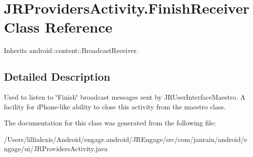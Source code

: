 \hypertarget{classcom_1_1janrain_1_1android_1_1engage_1_1ui_1_1_j_r_providers_activity_1_1_finish_receiver}{
\section{JRProvidersActivity.FinishReceiver Class Reference}
\label{classcom_1_1janrain_1_1android_1_1engage_1_1ui_1_1_j_r_providers_activity_1_1_finish_receiver}
}


Inherits android::content::BroadcastReceiver.



\subsection{Detailed Description}
Used to listen to \char`\"{}Finish\char`\"{} broadcast messages sent by JRUserInterfaceMaestro. A facility for iPhone-\/like ability to close this activity from the maestro class. 

The documentation for this class was generated from the following file:\begin{DoxyCompactItemize}
\item 
/Users/lillialexis/Android/engage.android/JREngage/src/com/janrain/android/engage/ui/JRProvidersActivity.java\end{DoxyCompactItemize}
